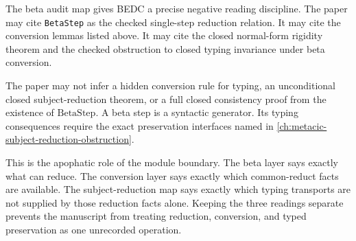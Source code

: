 The beta audit map gives BEDC a precise negative reading discipline. The paper
may cite \texttt{BetaStep} as the checked single-step reduction relation. It may
cite the conversion lemmas listed above. It may cite the closed normal-form
rigidity theorem and the checked obstruction to closed typing invariance under
beta conversion.

The paper may not infer a hidden conversion rule for typing, an unconditional
closed subject-reduction theorem, or a full closed consistency proof from the
existence of $\mathrm{BetaStep}$. A beta step is a syntactic generator. Its
typing consequences require the exact preservation interfaces named in
\autoref{ch:metacic-subject-reduction-obstruction}.

This is the apophatic role of the module boundary. The beta layer says exactly
what can reduce. The conversion layer says exactly which common-reduct facts are
available. The subject-reduction map says exactly which typing transports are
not supplied by those reduction facts alone. Keeping the three readings
separate prevents the manuscript from treating reduction, conversion, and typed
preservation as one unrecorded operation.


